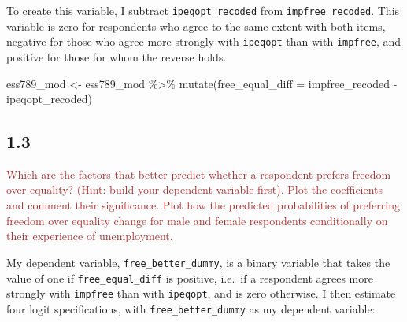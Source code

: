 \documentclass[
]{article}
\newenvironment{Shaded}{\begin{snugshade}}{\end{snugshade}}
\newcommand{\AttributeTok}[1]{\textcolor[rgb]{0.77,0.63,0.00}{#1}}
\newcommand{\FunctionTok}[1]{\textcolor[rgb]{0.00,0.00,0.00}{#1}}
\newcommand{\NormalTok}[1]{#1}
\newcommand{\OtherTok}[1]{\textcolor[rgb]{0.56,0.35,0.01}{#1}}
\newcommand{\SpecialCharTok}[1]{\textcolor[rgb]{0.00,0.00,0.00}{#1}}
\begin{document}
To create this variable, I subtract \texttt{ipeqopt\_recoded} from
\texttt{impfree\_recoded}. This variable is zero for respondents who
agree to the same extent with both items, negative for those who agree
more strongly with \texttt{ipeqopt} than with \texttt{impfree}, and
positive for those for whom the reverse holds.

\begin{Shaded}
\begin{Highlighting}[]
\NormalTok{ess789\_mod }\OtherTok{\textless{}{-}}\NormalTok{ ess789\_mod }\SpecialCharTok{\%\textgreater{}\%}
  \FunctionTok{mutate}\NormalTok{(}\AttributeTok{free\_equal\_diff =}\NormalTok{ impfree\_recoded }\SpecialCharTok{{-}}\NormalTok{ ipeqopt\_recoded)}
\end{Highlighting}
\end{Shaded}

\hypertarget{section-2}{%
\subsection{1.3}\label{section-2}}

\textcolor{brown}{Which are the factors that better predict whether a respondent prefers freedom over equality? (Hint: build your dependent variable first). Plot the coefficients and comment their significance. Plot how the predicted probabilities of preferring freedom over equality change for male and female respondents conditionally on their experience of unemployment.}

My dependent variable, \texttt{free\_better\_dummy}, is a binary
variable that takes the value of one if \texttt{free\_equal\_diff} is
positive, i.e.~if a respondent agrees more strongly with
\texttt{impfree} than with \texttt{ipeqopt}, and is zero otherwise. I
then estimate four logit specifications, with
\texttt{free\_better\_dummy} as my dependent variable:
\end{document}
